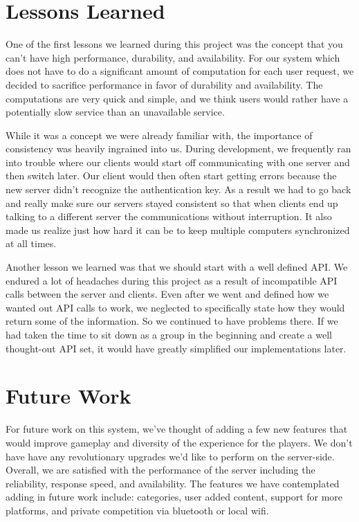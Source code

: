 \documentclass{dependencies/acm_proc_article-sp}
\begin{document}
\section{Lessons Learned}
One of the first lessons we learned during this project was the concept that you can't have high performance, durability, and availability.  For our system which does not have to do a significant amount of computation for each user request, we decided to sacrifice performance in favor of durability and availability.  The computations are very quick and simple, and we think users would rather have a potentially slow service than an unavailable service.

While it was a concept we were already familiar with, the importance of consistency was heavily ingrained into us.  During development, we frequently ran into trouble where our clients would start off communicating with one server and then switch later.  Our client would then often start getting errors because the new server didn't recognize the authentication key.  As a result we had to go back and really make sure our servers stayed consistent so that when clients end up talking to a different server the communications without interruption.  It also made us realize just how hard it can be to keep multiple computers synchronized at all times.

Another lesson we learned was that we should start with a well defined API.  We
endured a lot of headaches during this project as a result of incompatible API
calls between the server and clients.  Even after we went and defined how we
wanted out API calls to work, we neglected to specifically state how they would
return some of the information.  So we continued to have problems there.  If we
had taken the time to sit down as a group in the beginning and create a well
thought-out API set, it would have greatly simplified our implementations
later.  
\section{Future Work}
For future work on this system, we've thought of adding a few new features that would improve gameplay and diversity of the experience for the players.
We don't have have any revolutionary upgrades we'd like to perform on the server-side.
Overall, we are satisfied with the performance of the server including the reliability, response speed, and availability. The features we have contemplated adding in future work include: categories, user added content, support for more platforms, and private competition via bluetooth or local wifi.
\end{document}
